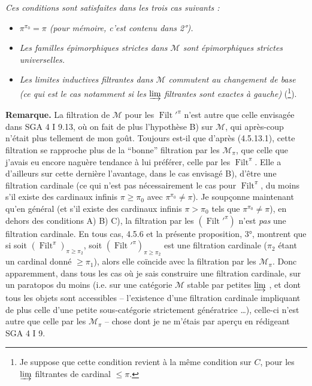 \documentclass[11pt]{article}
\newcommand{\msp}[1]{\marginpar{\footnotesize [#1]}}
\newcommand{\Filt}{\operatorname{Filt}}
\begin{document}
\msp{page 127}
\textit{Ces conditions sont satisfaites dans les trois cas suivants :}
\begin{itemize}
\item[\textit{A)}] \textit{$\pi^{\pi_0} = \pi$ (pour mémoire, c'est contenu dans 2°).}
\item[\textit{B)}] \textit{Les familles épimorphiques strictes dans $\mathcal{M}$ sont épimorphiques strictes universelles.}
\item[\textit{C)}] \textit{Les limites inductives filtrantes dans $\mathcal{M}$ commutent au changement de base (ce qui est le cas notamment si les} $\varinjlim$ \textit{filtrantes sont exactes à gauche)} (\footnote{Je suppose que cette condition revient à la même condition sur $C$, pour les $\varinjlim$ filtrantes de cardinal $\leqslant \pi$.}).
\end{itemize}

\textbf{Remarque.} La filtration de $\mathcal{M}$ pour les $\Filt'^{\pi}$ n'est autre que celle envisagée dans SGA 4 I 9.13, où on fait de plus l'hypothèse B) sur $\mathcal{M}$, qui après-coup n'était plus tellement de mon goût. Toujours est-il que d'après (4.5.13.1), cette filtration se rapproche plus de la ``bonne'' filtration par les $\mathcal{M}_{\pi}$, que celle que j'avais eu encore naguère tendance à lui préférer, celle par les $\Filt^{\pi}$. Elle a d'ailleurs sur cette dernière l'avantage, dans le cas envisagé B), d'être une filtration cardinale (ce qui n'est pas nécessairement le cas pour $\Filt^{\pi}$, du moins s'il existe des cardinaux infinis $\pi \geqslant \pi_0$ avec $\pi^{\pi_0} \neq \pi$). Je soupçonne maintenant qu'en général (et s'il existe des cardinaux infinis $\pi > \pi_0$ tels que $\pi^{\pi_0} \neq \pi$), en dehors des conditions A) B) C), la filtration par les $(\Filt'^{\pi})$ n'est \textit{pas} une
\msp{page 128}
filtration cardinale. En tous cas, 4.5.6 et la présente proposition, 3°, montrent que si soit $(\Filt^{\pi})_{\pi\geqslant\pi_2}$, soit $(\Filt'^{\pi})_{\pi\geqslant\pi_2}$ est une filtration cardinale ($\pi_2$ étant un cardinal donné $\geqslant \pi_1$), alors elle coïncide avec la filtration par les $\mathcal{M}_{\pi}$. Donc apparemment, dans tous les cas où je sais construire une filtration cardinale, sur un paratopos du moins (i.e. sur une catégorie $\mathcal{M}$ stable par petites $\varinjlim$ , et dont tous les objets sont accessibles -- l'existence d'une filtration cardinale impliquant de plus celle d'une petite sous-catégorie strictement génératrice \dots), celle-ci n'est autre que celle par les $\mathcal{M}_{\pi}$ -- chose dont je ne m'étais par aperçu en rédigeant SGA 4 I 9. %
\end{document}
